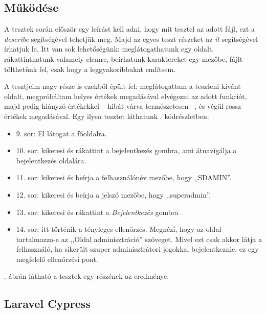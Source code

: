 \documentclass[
]{thesis-ekf}
\theoremstyle{definition}
\theoremstyle{remark}
\begin{document}
\subsection{Működése}

A tesztek során először egy leírást kell adni, hogy mit tesztel az adott fájl, ezt a \emph{describe} segítségével tehetjük meg. Majd az egyes teszt részeket az \emph{it} segítségével írhatjuk le. Itt van sok lehetőségünk: meglátogathatunk egy oldalt, rákattinthatunk valamely elemre, beírhatunk karaktereket egy mezőbe, fájlt tölthetünk fel, csak hogy a leggyakoribbakat említsem.

A tesztjeim nagy része is ezekből épült fel: meglátogattam a teszteni kívánt oldalt, megpróbáltam helyes értékek megadásával elvégezni az adott funkciót, majd pedig hiányzó értékekkel -- hibát várva természetesen --, és végül rossz értékek megadásával. Egy ilyen tesztet láthatunk . kódrészletben:
\begin{itemize}
	\item 9. sor: El látogat a főoldalra.
	\item 10. sor: kikeresi és rákattint a bejelentkezés gombra, ami átnavigálja a bejelentkezés oldalára.
	\item 11. sor: kikeresi és beírja a felhasználónév mezőbe, hogy ,,SDAMIN''.
	\item 12. sor: kikeresi és beírja a jelszó mezőbe, hogy ,,superadmin''.
	\item 13. sor: kikeresi és rákattint a \emph{Bejelentkezés} gombra
	\item 14. sor: itt történik a tényleges ellenőrzés. Megnézi, hogy az oldal tartalmazza-e az ,,Oldal adminisztráció'' szöveget. Mivel ezt csak akkor látja a felhasználó, ha sikerült szuper adminisztrátori jogokkal bejelentkeznie, ez egy megfelelő ellenőrzési pont.
\end{itemize}



. ábrán látható a tesztek egy részének az eredménye.

\subsection{Laravel Cypress}
\end{document}
